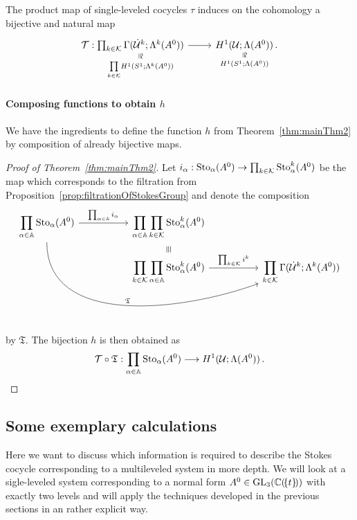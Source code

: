 \begin{cor}
  The product map of single-leveled cocycles $\tau$ induces on the cohomology
  a bijective and natural map
  \[ \begin{tikzcd}
    \cT:
    \underset{\underset{k\in\cK}\prod H^1(S^1;\Lambda^k(A^0))}{%
      \underset{\text{\rotatebox[origin=c]{-90}{$\cong$}}}{%
        \prod_{k\in\cK}\Gamma(\dot\cU^k;\Lambda^k(A^0))}}
    \rar&
    \underset{H^1(S^1;\Lambda(A^0))}{%
      \underset{\text{\rotatebox[origin=c]{-90}{$\cong$}}}{%
        H^1(\cU;\Lambda(A^0))}}\,.
  \end{tikzcd} \]
\end{cor}

\paragraph{Composing functions to obtain $h$}
We have the ingredients to define the function $h$ from
Theorem~\ref{thm:mainThm2} by composition of already bijective maps.
\begin{proof}[Proof of Theorem~\ref{thm:mainThm2}]
  Let $i_\alpha:\operatorname{Sto}_\alpha(A^0)\to\prod_{k\in\mathcal{K}}\operatorname{Sto}_\alpha^k(A^0)$ be the
  map which corresponds to the filtration from
  Proposition~\ref{prop:filtrationOfStokesGroup} and
  denote the composition
  \[ \begin{tikzcd}[column sep=1.8cm,row sep=0]
      \displaystyle \prod_{\alpha\in\A}\Sto_\alpha(A^0)
      \rar{\prod_{\alpha\in\A}i_\alpha}
      \arrow[ddrr, out=270,in=200,"\mathfrak{T}"]
      &
      \displaystyle \prod_{\alpha\in\A}\prod_{k\in\cK}\Sto_\alpha^k(A^0)
    \\&\text{\rotatebox[origin=c]{-90}{$\equiv$}}
    \\&\displaystyle \prod_{k\in\cK}\prod_{\alpha\in\A}\Sto_\alpha^k(A^0)
      \rar{\prod_{k\in\cK}i^k}&
      \displaystyle \prod_{k\in\cK}\Gamma(\dot\cU^k;\Lambda^k(A^0))
  \end{tikzcd} \]
  by $\mathfrak{T}$. The bijection $h$ is then obtained as
  \[
    \mathcal{T}\circ\mathfrak{T}: \prod_{\alpha\in\mathbb{A}}\operatorname{Sto}_\alpha(A^0)
    \longrightarrow H^1(\mathcal{U};\Lambda(A^0)) \,.
  \]
\end{proof}

\subsection{Some exemplary calculations}\label{sec:WhichInformationIsNeeded}
Here we want to discuss which information is required to describe the Stokes
cocycle corresponding to a multileveled system in more depth.
We will look at a sigle-leveled system corresponding to a normal form
$A^0\in \operatorname{GL}_3(\mathbb{C}(\!\{t\}\!))$ with exactly two levels and will apply the
techniques developed in the previous sections in an rather explicit way.

